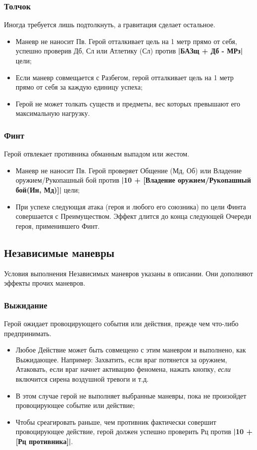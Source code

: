 \subsubsection{Толчок}
Иногда требуется лишь подтолкнуть, а гравитация сделает остальное.
\begin{itemize}
  \item Маневр не наносит Пв. Герой отталкивает цель на 1 метр прямо от себя, успешно проверив Дб, Сл или Атлетику (Сл) против \textbf{|БАЗщ + Дб - МРз|} цели;
  \item Если маневр совмещается с Разбегом, герой отталкивает цель на 1 метр прямо от себя за каждую единицу успеха;
  \item Герой не может толкать существ и предметы, вес которых превышают его максимальную нагрузку.
\end{itemize}

\subsubsection{Финт}
Герой отвлекает противника обманным выпадом или жестом.
\begin{itemize}
  \item Маневр не наносит Пв. Герой проверяет Общение (Мд, Об) или Владение оружием/Рукопашный бой против \textbf{|10 + [Владение оружием/Рукопашный бой(Ин, Мд)]|} цели;
  \item При успехе следующая атака (героя и любого его союзника) по цели Финта совершается с Преимуществом. Эффект длится до конца следующей Очереди героя, применившего Финт.
\end{itemize}

\subsection{Независимые маневры}
Условия выполнения Независимых маневров указаны в описании. Они дополняют эффекты прочих маневров.

\subsubsection{Выжидание}
Герой ожидает провоцирующего события или действия, прежде чем что-либо предпринимать.
\begin{itemize}
  \item Любое Действие может быть совмещено с этим маневром и выполнено, как Выжидающее. Например: Захватить, если враг потянется за оружием, Атаковать, если враг начнет активацию феномена, нажать кнопку, \textit{если} включится сирена воздушной тревоги и т.д.
  \item В этом случае герой не выполняет выбранные маневры, пока не произойдет провоцирующее событие или действие;
  \item Чтобы среагировать раньше, чем противник фактически совершит провоцирующее действие, герой должен успешно проверить Рц против \textbf{|10 + [Рц противника]|}. 
\end{itemize}

